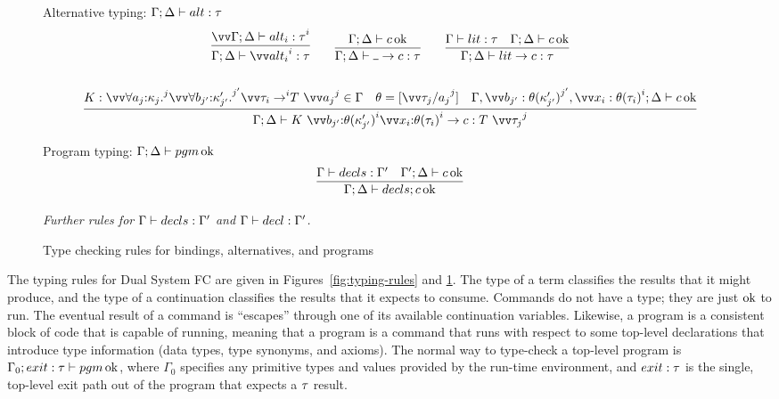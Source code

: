 \documentclass{article}
\begin{document}
\begin{figure}[h]
Alternative typing: $\Gamma; \Delta \vdash alt : \tau$
\begin{gather*}
  \infer
  {\Gamma;\Delta \vdash \vect[i]{\analt_i} : \ty}
  {
    \vect[i]{\Gamma;\Delta \vdash \analt_i : \ty}
  }
  \qquad
  \infer
  {\Gamma;\Delta \vdash \alt{\blank}{\com} : \ty}
  {\Gamma;\Delta \vdash \com \Ok}
  \qquad
  \infer
  {\Gamma;\Delta \vdash \alt{\lit}{\com} : \ty}
  {
    \Gamma \vdash \lit : \ty
    &
    \Gamma;\Delta \vdash \com \Ok
  }
  \\\\
  \infer
  {
    \Gamma;\Delta
    \vdash
    \alt{K ~ \vect[i]{\ann{b_{j'}}{\theta(\ki'_{j'})}} \vect[i]{\ann{x_{i}}{\theta(\ty_{i})}}}{\com}
    :
    T ~ \vect[j]{\tau_j}
  }
  {
    K
    :
    \vect[j]{\forall\ann{a_j}{\ki_j}.} \vect[j']{\forall\ann{b_{j'}}{\ki'_{j'}}.}
      \vect[i]{\ty_{i} \to} T ~ \vect[j]{a_j}
    \in
    \Gamma
    &
    \theta = [\vect[j]{\tau_j/a_j}]
    &
    \Gamma,
    \vect[j']{b_{j'}:\theta(\ki'_{j'})},
    \vect[i]{x_{i}:\theta(\ty_{i})};
    \Delta
    \vdash
    \com \Ok
  }
\end{gather*}

Program typing: $\Gamma;\Delta \vdash pgm \operatorname{ok}$
\begin{gather*}
  \infer
  {\Gamma; \Delta \vdash \decls; c \Ok}
  {
    \Gamma \vdash \decls : \Gamma'
    &
    \Gamma';\Delta \vdash c \Ok
  }
\end{gather*}

\emph{Further rules for $\Gamma \vdash decls : \Gamma'$ and
  $\Gamma \vdash decl : \Gamma'$.}
\caption{Type checking rules for bindings, alternatives, and programs}
\label{fig:typing-rules-binds}
\end{figure}

The typing rules for Dual System FC are given in Figures~\ref{fig:typing-rules}
and \ref{fig:typing-rules-binds}.  The type of a term classifies the results
that it might produce, and the type of a continuation classifies the results
that it expects to consume.  Commands do not have a type; they are just $\operatorname{ok}$ to
run.  The eventual result of a command is ``escapes'' through one of its
available continuation variables.  Likewise, a program is a consistent block of
code that is capable of running, meaning that a program is a command that runs
with respect to some top-level declarations that introduce type information
(data types, type synonyms, and axioms).  The normal way to type-check a
top-level program is $\Gamma_0;exit:\tau \vdash pgm \operatorname{ok}$, where $\Gamma_0$
specifies any primitive types and values provided by the run-time environment,
and $exit:\tau$ is the single, top-level exit path out of the program that expects
a $\tau$ result.
\end{document}

